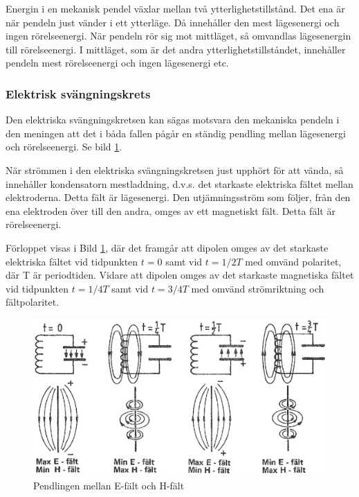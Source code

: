 Energin i en mekanisk pendel växlar mellan två
ytterlighetstillstånd. Det ena är när pendeln just vänder i ett
ytterläge. Då innehåller den mest lägesenergi och ingen
rörelseenergi. När pendeln rör sig mot mittläget, så omvandlas
lägesenergin till rörelseenergi. I mittläget, som är det andra
ytterlighetstillståndet, innehåller pendeln mest rörelseenergi och
ingen lägesenergi etc.

\subsubsection{Elektrisk svängningskrets}

Den elektriska svängningskretsen kan sägas motsvara den mekaniska
pendeln i den meningen att det i båda fallen pågår en ständig pendling
mellan lägesenergi och rörelseenergi. Se bild \ref{fig:BildII7-02}.

När strömmen i den elektriska svängningskretsen just upphört för att
vända, så innehåller kondensatorn mestladdning, d.v.s. det starkaste
elektriska fältet mellan elektroderna. Detta fält är lägesenergi. Den
utjämningsström som följer, från den ena elektroden över till den
andra, omges av ett magnetiskt fält. Detta fält är rörelseenergi.

Förloppet visas i Bild \ref{fig:BildII7-02}, där det framgår att dipolen omges av
det starkaste elektriska fältet vid tidpunkten \(t=0\) samt vid
\(t=1/2T\) med omvänd polaritet, där T är periodtiden. Vidare att
dipolen omges av det starkaste magnetiska fältet vid tidpunkten
\(t=1/4T\) samt vid \(t=3/4T\) med omvänd strömriktning och
fältpolaritet.

\begin{figure}
\includegraphics[width=\textwidth]{images/cropped_pdfs/bild_2_7-02.pdf}
\caption{Pendlingen mellan E-fält och H-fält}
\label{fig:BildII7-02}
\end{figure}

